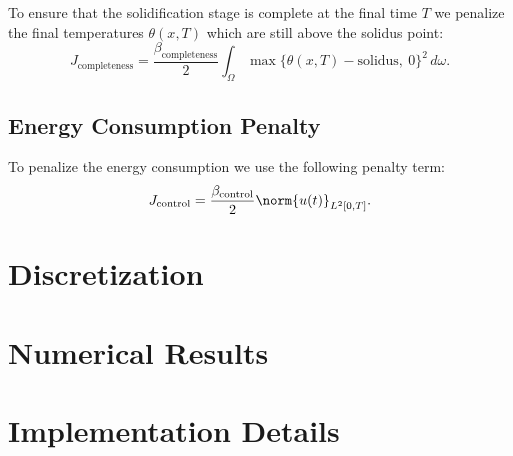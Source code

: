 To ensure that the solidification stage is complete at the final time $T$ we penalize the final temperatures $\theta(x, T)$ which are still above the solidus point:
\begin{equation}
	J_{\text{completeness}} =
	\frac{\beta_\text{completeness}}{2} \int_{\Omega} \max\{ \theta(x, T) - \text{solidus},\ 0 \}^2\, d\omega.
\end{equation}

\subsection{Energy Consumption Penalty}

To penalize the energy consumption we use the following penalty term:
\begin{equation}
	J_{\text{control}} =
	\frac{\beta_\text{control}}{2} \norm{u(t)}_{L^2[0,T]}.
\end{equation}



\section{Discretization}
\label{sec:discretization}

\section{Numerical Results}
\label{sec:numerical_results}

\appendix

\section{Implementation Details}
